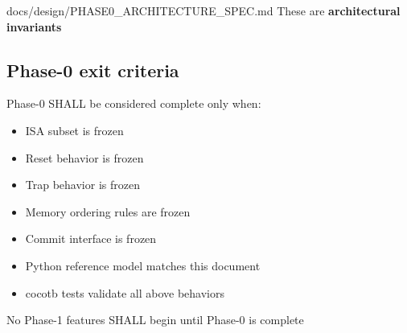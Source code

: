\begin{relocated}{docs/design/PHASE0_ARCHITECTURE_SPEC.md}
These are \textbf{architectural invariants}

\subsection{Phase-0 exit criteria}\label{ds:ch:phase0-architecture:phase-0-exit-criteria}

Phase-0 SHALL be considered complete only when:

\begin{itemize}
\tightlist
\item
  ISA subset is frozen
\item
  Reset behavior is frozen
\item
  Trap behavior is frozen
\item
  Memory ordering rules are frozen
\item
  Commit interface is frozen
\item
  Python reference model matches this document
\item
  cocotb tests validate all above behaviors
\end{itemize}

No Phase-1 features SHALL begin until Phase-0 is complete
\end{relocated}

